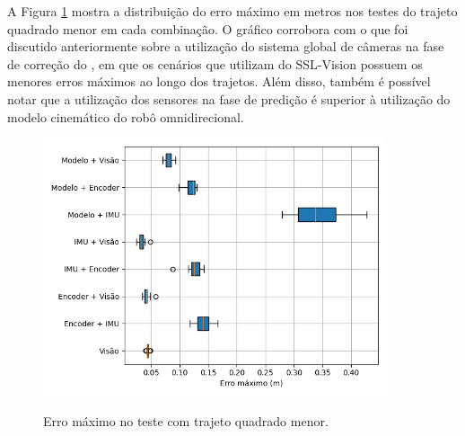 \documentclass[acronym, symbols, table, deposito]{fei}
\begin{document}
	A Figura \ref{fig:erro_maximo_distancia_quad_menor} mostra a distribuição do erro máximo em metros nos testes do trajeto quadrado menor em cada combinação. O gráfico corrobora com o que foi discutido anteriormente sobre a utilização do sistema global de câmeras na fase de correção do , em que os cenários que utilizam do SSL-Vision possuem os menores erros máximos ao longo dos trajetos. Além disso, também é possível notar que a utilização dos sensores na fase de predição é superior à utilização do modelo cinemático do robô omnidirecional.
	
	\begin{figure}[!htb]
		\centering
		\caption{Erro máximo no teste com trajeto quadrado menor.}
		\includegraphics[width=0.9\textwidth]{../Dados/Graficos-Resultados/erro_maximo_distancia_quadrado_menor.png}
		\label{fig:erro_maximo_distancia_quad_menor}
	\end{figure}
%
%
%
\end{document}
